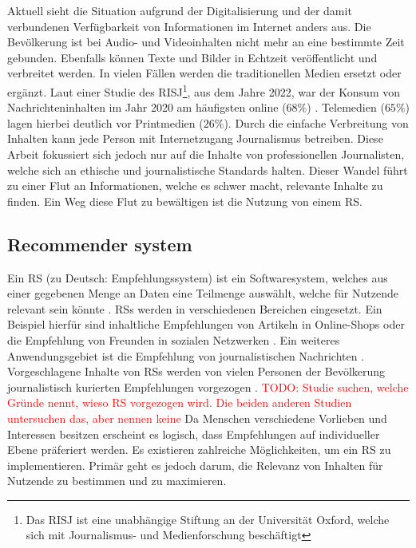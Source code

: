 Aktuell sieht die Situation aufgrund der Digitalisierung und der damit verbundenen Verfügbarkeit von Informationen im Internet anders aus.
Die Bevölkerung ist bei Audio- und Videoinhalten nicht mehr an eine bestimmte Zeit gebunden.
Ebenfalls können Texte und Bilder in Echtzeit veröffentlicht und verbreitet werden.
In vielen Fällen werden die traditionellen Medien ersetzt oder ergänzt.
Laut einer Studie des \ac{RISJ}\footnote{Das \ac{RISJ} ist eine unabhängige Stiftung an der Universität Oxford, welche sich mit Journalismus- und Medienforschung beschäftigt}, aus dem Jahre 2022, war der Konsum von Nachrichteninhalten im Jahr 2020 am häufigsten online ($68\%$) \cite{reuters-2022}.
Telemedien ($65\%$) lagen hierbei deutlich vor Printmedien ($26\%$).
Durch die einfache Verbreitung von Inhalten kann jede Person mit Internetzugang Journalismus betreiben.
Diese Arbeit fokussiert sich jedoch nur auf die Inhalte von professionellen Journalisten, welche sich an ethische und journalistische Standards halten.
Dieser Wandel führt zu einer Flut an Informationen, welche es schwer macht, relevante Inhalte zu finden.
Ein Weg diese Flut zu bewältigen ist die Nutzung von einem \ac{RS}.

\subsection{Recommender system}
Ein \acf{RS} (zu Deutsch: Empfehlungssystem) ist ein Softwaresystem, welches aus einer gegebenen Menge an Daten eine Teilmenge auswählt, welche für Nutzende relevant sein könnte \cite{recommender-systems}.
\acp{RS} werden in verschiedenen Bereichen eingesetzt.
Ein Beispiel hierfür sind inhaltliche Empfehlungen von Artikeln in Online-Shops oder die Empfehlung von Freunden in sozialen Netzwerken \cite{ecommerce-recommender, social-recommender}.
Ein weiteres Anwendungsgebiet ist die Empfehlung von journalistischen Nachrichten \cite{news-recommender}.
Vorgeschlagene Inhalte von \acp{RS} werden von vielen Personen der Bevölkerung journalistisch kurierten Empfehlungen vorgezogen \cite{recommender-preference, theory-of-machine}.
\textcolor{red}{TODO: Studie suchen, welche Gründe nennt, wieso RS vorgezogen wird. Die beiden anderen Studien untersuchen das, aber nennen keine}
Da Menschen verschiedene Vorlieben und Interessen besitzen erscheint es logisch, dass Empfehlungen auf individueller Ebene präferiert werden.
Es existieren zahlreiche Möglichkeiten, um ein \ac{RS} zu implementieren.
Primär geht es jedoch darum, die Relevanz von Inhalten für Nutzende zu bestimmen und zu maximieren. \\

